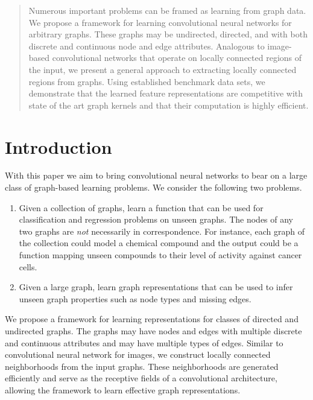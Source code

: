 \documentclass{article}
\begin{document}
 


\begin{abstract}
Numerous important problems can be framed as learning from graph data. 
We propose a framework for learning convolutional neural networks for arbitrary graphs. These graphs may be undirected, directed, and with both discrete and continuous node and edge attributes. Analogous to image-based convolutional networks that operate on locally connected regions of the input, we present a general approach to extracting locally connected regions from  graphs. Using established benchmark data sets, we demonstrate that the learned feature representations are competitive with state of the art graph kernels and that their computation is highly efficient. 
\end{abstract}

\section{Introduction}

With this paper we aim to bring convolutional neural networks to bear on a large class of graph-based learning problems. We consider the following two problems.
\begin{enumerate}
\item Given a collection of graphs, learn a function that can be used for classification and regression problems on unseen graphs. The nodes of any two graphs are \emph{not} necessarily in correspondence. For instance, each graph of the collection could model a chemical compound and the output could be a function mapping unseen compounds to their level of activity against cancer cells.
\item Given a large graph, learn graph representations that can be used to infer unseen graph properties such as node types and missing edges. 
\end{enumerate}

We propose a framework for learning representations for classes of directed and undirected graphs. The graphs may have nodes and edges with multiple discrete and continuous attributes and may have multiple types of edges. Similar to convolutional neural network for images, we construct locally connected neighborhoods from the input graphs. These neighborhoods are generated efficiently and serve as the receptive fields of a convolutional architecture, allowing the framework to learn effective graph representations. 
\end{document}
